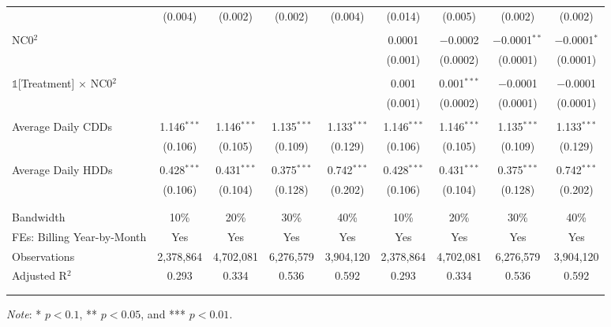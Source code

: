 {\begin{table}[t!]
\begin{adjustbox}{scale = 0.9}
\begin{threeparttable}
\begin{tabular}{@{\extracolsep{3pt}}lcccccccc}
                    & (0.004) & (0.002) & (0.002) & (0.004) & (0.014) & (0.005) & (0.002) & (0.002) \\ 
                    & & & & & & & & \\ 
                    NC0$^{2}$ &  &  &  &  & 0.0001 & $-$0.0002 & $-$0.0001$^{**}$ & $-$0.0001$^{*}$ \\ 
                    &  &  &  &  & (0.001) & (0.0002) & (0.0001) & (0.0001) \\ 
                    & & & & & & & & \\ 
                    $\mathbb{1}$[Treatment] $\times$ NC0$^{2}$ &  &  &  &  & 0.001 & 0.001$^{***}$ & $-$0.0001 & $-$0.0001 \\ 
                    &  &  &  &  & (0.001) & (0.0002) & (0.0001) & (0.0001) \\ 
                    & & & & & & & & \\ 
                    Average Daily CDDs & 1.146$^{***}$ & 1.146$^{***}$ & 1.135$^{***}$ & 1.133$^{***}$ & 1.146$^{***}$ & 1.146$^{***}$ & 1.135$^{***}$ & 1.133$^{***}$ \\ 
                    & (0.106) & (0.105) & (0.109) & (0.129) & (0.106) & (0.105) & (0.109) & (0.129) \\ 
                    & & & & & & & & \\ 
                    Average Daily HDDs & 0.428$^{***}$ & 0.431$^{***}$ & 0.375$^{***}$ & 0.742$^{***}$ & 0.428$^{***}$ & 0.431$^{***}$ & 0.375$^{***}$ & 0.742$^{***}$ \\ 
                    & (0.106) & (0.104) & (0.128) & (0.202) & (0.106) & (0.104) & (0.128) & (0.202) \\ 
                    & & & & & & & & \\
                    \hline
                    \\[-2.0ex]
                    Bandwidth & 10\% & 20\% & 30\% & 40\% & 10\% & 20\% & 30\% & 40\% \\ 
                    FEs: Billing Year-by-Month & Yes & Yes & Yes & Yes & Yes & Yes & Yes & Yes \\ 
                    Observations & 2,378,864 & 4,702,081 & 6,276,579 & 3,904,120 & 2,378,864 & 4,702,081 & 6,276,579 & 3,904,120 \\ 
                    Adjusted R$^{2}$ & 0.293 & 0.334 & 0.536 & 0.592 & 0.293 & 0.334 & 0.536 & 0.592 \\ 
                    \\[-2.0ex]
                    \hline \hline
                    \\[-4.5ex]
                \end{tabular}
                \begin{tablenotes}[flushleft]
                    \footnotesize
                    \item \textit{Note}: * $p < 0.1$, ** $p < 0.05$, and *** $p < 0.01$.
                \end{tablenotes}
            \end{threeparttable}
        \end{adjustbox}
        
    \end{table}
}
